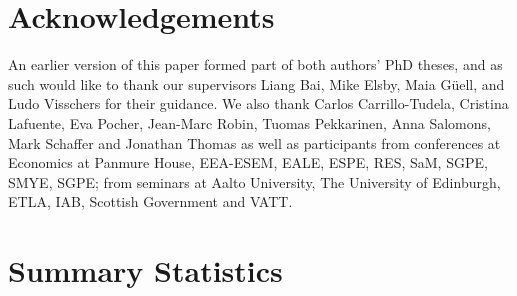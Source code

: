 \documentclass[12pt,authoryear]{elsarticle}
\begin{document}
	
	
	
	
	
	
	
	\newpage
	\section{Acknowledgements}
	
	An earlier version of this paper formed part of both authors' PhD theses, and as such would like to thank our supervisors Liang Bai, Mike Elsby, Maia G\"{u}ell, and Ludo Visschers for their guidance. We also thank Carlos Carrillo-Tudela, Cristina Lafuente, Eva Pocher, Jean-Marc Robin, Tuomas Pekkarinen, Anna Salomons, Mark Schaffer and Jonathan Thomas as well as participants from conferences at Economics at Panmure House, EEA-ESEM, EALE, ESPE, RES, SaM, SGPE, SMYE, SGPE; from seminars at Aalto University, The University of Edinburgh, ETLA,  IAB, Scottish Government and VATT. 
	\newpage
	\appendix
	\setcounter{table}{0}
	\section{Summary Statistics}
	\label{app:SummaryStats}
	
	 
	
	
		 
			\vspace{2mm}
	
	 
		\vspace{2mm}
	
	 
	\vspace{2mm}
	
\end{document}
